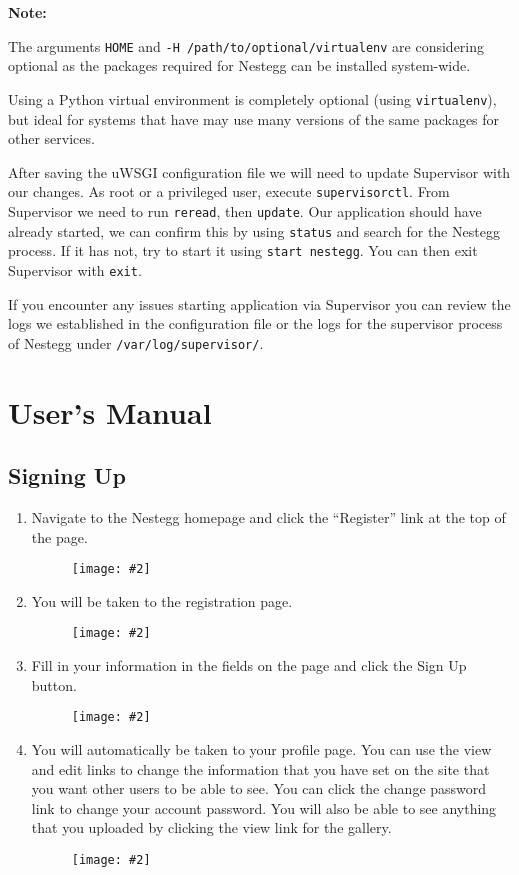 \documentclass[11pt]{article}
\newcommand{\cmd}[1]{\textcolor{code}{\texttt{#1}}}
\newcommand{\image}[2][]{
    \begin{figure}[!htbp]\centering\texttt{[image: \#2]}\end{figure}
}
\newcommand\note[1]{
	\vspace{12pt}
	
	\begin{centering}
	\hfill
	\fcolorbox{black}{light-gray} 
    {
    \begin{minipage}{\textwidth}
    \vspace{4pt}
    	\textbf{Note:}
    	\vspace{8pt}
    	
    	#1
    \vspace{4pt}
    \end{minipage}
    }
    \hfill
    \end{centering}
    
    \vspace{12pt}
}
\begin{document}
				\note{The arguments \cmd{HOME} and \cmd{-H /path/to/optional/virtualenv} are considering optional as the packages required for Nestegg can be installed system-wide.
				
				\vspace{11pt}
				Using a Python virtual environment is completely optional (using \cmd{virtualenv}), but ideal for systems that have may use many versions of the same packages for other services.}
				
				After saving the uWSGI configuration file we will need to update Supervisor with our changes. As root or a privileged user, execute \cmd{supervisorctl}. From Supervisor we need to run \cmd{reread}, then \cmd{update}. Our application should have already started, we can confirm this by using \cmd{status} and search for the Nestegg process. If it has not, try to start it using \cmd{start nestegg}. You can then exit Supervisor with \cmd{exit}.
				
				If you encounter any issues starting application via Supervisor you can review the logs we established in the configuration file or the logs for the supervisor process of Nestegg under \cmd{/var/log/supervisor/}.
				
	\section{User's Manual}
	
		\subsection{Signing Up}
			\begin{enumerate}
				\item Navigate to the Nestegg homepage and click the ``Register'' link at the top of the page. \image{images/Register 1.jpg}					
				\item You will be taken to the registration page. \image{images/Register 2.jpg}
				\item Fill in your information in the fields on the page and click the Sign Up button. \image{images/Register 3.jpg}
				\item You will automatically be taken to your profile page. You can use the view and edit links to change the information that you have set on the site that you want other users to be able to see. You can click the change password link to change your account password. You will also be able to see anything that you uploaded by clicking the view link for the gallery. \image{images/Register 4.jpg}
			\end{enumerate}
		
\end{document}
